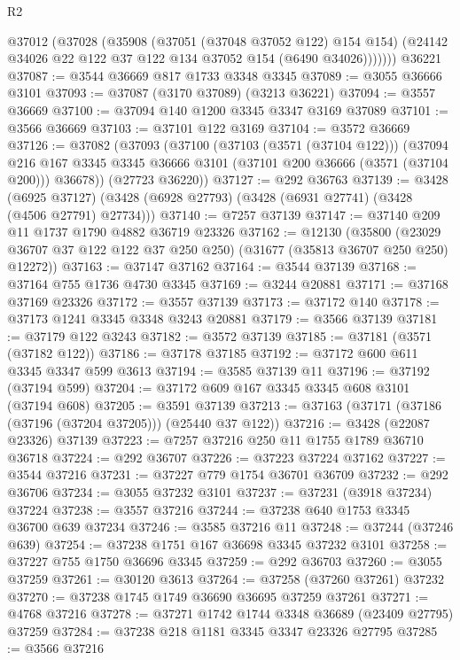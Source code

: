 \begin{lexlean}{R2}
\begin{coremodule}
        @37012
          (@37028
            (@35908
              (@37051 (@37048 @37052 @122) @154 @154)
              (@24142 @34026 @22 @122 @37 @122 @134 @37052 @154 (@6490 @34026)))))))
    @36221
@37087 := @3544 @36669 @817 @1733 @3348 @3345
@37089 := @3055 @36666 @3101
@37093 := @37087 (@3170 @37089) (@3213 @36221)
@37094 := @3557 @36669
@37100 := @37094 @140 @1200 @3345 @3347 @3169 @37089
@37101 := @3566 @36669
@37103 := @37101 @122 @3169
@37104 := @3572 @36669
@37126 := @37082
    (@37093
      (@37100
        (@37103 (@3571 (@37104 @122)))
        (@37094
          @216
          @167
          @3345
          @3345
          @36666
          @3101
          (@37101 @200 @36666 (@3571 (@37104 @200)))
          @36678))
      (@27723 @36220))
@37127 := @292 @36763
@37139 := @3428
    (@6925 @37127)
    (@3428 (@6928 @27793) (@3428 (@6931 @27741) (@3428 (@4506 @27791) @27734)))
@37140 := @7257 @37139
@37147 := @37140 @209 @11 @1737 @1790 @4882 @36719 @23326
@37162 := @12130
    (@35800 (@23029 @36707 @37 @122 @122 @37 @250 @250) (@31677 (@35813 @36707 @250 @250) @12272))
@37163 := @37147 @37162
@37164 := @3544 @37139
@37168 := @37164 @755 @1736 @4730 @3345
@37169 := @3244 @20881
@37171 := @37168 @37169 @23326
@37172 := @3557 @37139
@37173 := @37172 @140
@37178 := @37173 @1241 @3345 @3348 @3243 @20881
@37179 := @3566 @37139
@37181 := @37179 @122 @3243
@37182 := @3572 @37139
@37185 := @37181 (@3571 (@37182 @122))
@37186 := @37178 @37185
@37192 := @37172 @600 @611 @3345 @3347 @599 @3613
@37194 := @3585 @37139 @11
@37196 := @37192 (@37194 @599)
@37204 := @37172 @609 @167 @3345 @3345 @608 @3101 (@37194 @608)
@37205 := @3591 @37139
@37213 := @37163 (@37171 (@37186 (@37196 (@37204 @37205))) (@25440 @37 @122))
@37216 := @3428 (@22087 @23326) @37139
@37223 := @7257 @37216 @250 @11 @1755 @1789 @36710 @36718
@37224 := @292 @36707
@37226 := @37223 @37224 @37162
@37227 := @3544 @37216
@37231 := @37227 @779 @1754 @36701 @36709
@37232 := @292 @36706
@37234 := @3055 @37232 @3101
@37237 := @37231 (@3918 @37234) @37224
@37238 := @3557 @37216
@37244 := @37238 @640 @1753 @3345 @36700 @639 @37234
@37246 := @3585 @37216 @11
@37248 := @37244 (@37246 @639)
@37254 := @37238 @1751 @167 @36698 @3345 @37232 @3101
@37258 := @37227 @755 @1750 @36696 @3345
@37259 := @292 @36703
@37260 := @3055 @37259
@37261 := @30120 @3613
@37264 := @37258 (@37260 @37261) @37232
@37270 := @37238 @1745 @1749 @36690 @36695 @37259 @37261
@37271 := @4768 @37216
@37278 := @37271 @1742 @1744 @3348 @36689 (@23409 @27795) @37259
@37284 := @37238 @218 @1181 @3345 @3347 @23326 @27795
@37285 := @3566 @37216

\end{coremodule}
\end{lexlean}
